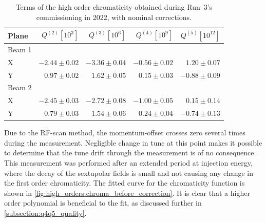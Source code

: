 \begin{table}[!htb]
    \centering
    \begin{tabular}{lrrrr}
    \toprule
         Plane & $Q^{(2)} [10^3]$ & $Q^{(3)} [10^6]$ & $Q^{(4)} [10^9]$ & $Q^{(5)} [10^{12}]$ \\
    \midrule
        Beam 1 &              &               &              & \\
        \hspace{2mm}X         & $-2.44 \pm 0.02$ & $-3.36 \pm 0.04$ & $-0.56 \pm 0.02 $ & $ 1.20 \pm 0.07$ \\
        \hspace{2mm}Y         & $ 0.97 \pm 0.02$ & $ 1.62 \pm 0.05$ &$  0.15 \pm 0.03$ & $-0.88 \pm 0.09$ \\
        Beam 2 &              &                &                & \\
        \hspace{2mm}X         & $-2.45 \pm 0.03$ & $-2.72 \pm 0.08$ & $-1.00 \pm 0.05 $ & $ 0.15 \pm 0.14$ \\
        \hspace{2mm}Y         & $ 0.79 \pm 0.03$ & $1.54 \pm 0.06 $ & $ 0.24 \pm 0.04 $ & $-0.74 \pm 0.13$ \\
    \bottomrule
    \end{tabular}
    \caption{Terms of the high order chromaticity obtained during Run~3's commissioning in 2022,
    with nominal corrections.}
    \label{tab:high_orders:chroma_fidel}
  \end{table}

Due to the RF-scan method, the momentum-offset crosses zero several times during the measurement.
Negligible change in tune at this point makes it possible to determine that the tune drift through
the measurement is of no consequence.
This measurement was performed after an extended period at injection energy, where the decay of the
sextupolar fields is small and not causing any change in the first order chromaticity. The fitted
curve for the chromaticity function is shown in \cref{fig:high_orders:chroma_before_correction}. 
It is clear that a higher order polynomial is beneficial to the fit, as discussed further in
\cref{subsection:q4q5_quality}.

